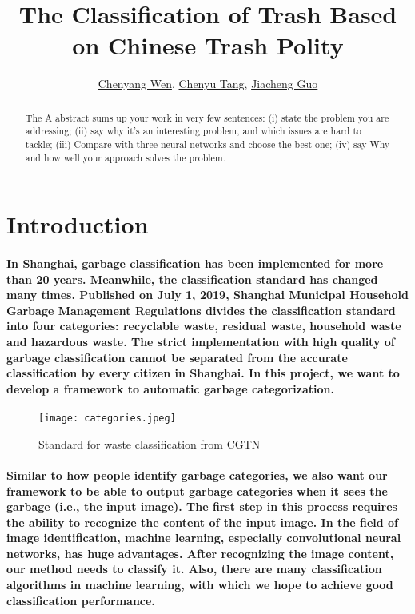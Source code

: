 \documentclass{article}
\title{The Classification of Trash Based on Chinese Trash Polity}
\author{\href{mailto:cw3923@nyu.edu}{Chenyang Wen}, \href{mailto:ct2831@nyu.edu}{Chenyu Tang},
\href{mailto:jg5315@nyu.edu}{Jiacheng Guo}}
\date{\vspace{-5ex}} %
\begin{document}
\maketitle
\thispagestyle{firstpage}


\begin{abstract}
    The
    A abstract sums up your work in very few sentences:
    (i) state the problem you are addressing;
    (ii) say why it’s an interesting problem, and which issues are hard to tackle;
    (iii) Compare with three neural networks and choose the best one;
    (iv) say Why and how well your approach solves the problem.
\end{abstract}


\section*{Introduction}
\paragraph{In Shanghai, garbage classification has been implemented for more than 20 years. Meanwhile, the classification standard has changed many times. Published on July 1, 2019, Shanghai Municipal Household Garbage Management Regulations divides the classification standard into four categories: recyclable waste, residual waste, household waste and hazardous waste.  The strict implementation with high quality of garbage classification cannot be separated from the accurate classification by every citizen in Shanghai. In this project, we want to develop a framework to automatic garbage categorization.}

\begin{figure}
    \begin{centering}
    \texttt{[image: categories.jpeg]}
    \par\end{centering}
    \caption{Standard for waste classification from CGTN}
    \label{fig:Trash_classification}
\end{figure}

\paragraph{Similar to how people identify garbage categories, we also want our framework to be able to output garbage categories when it sees the garbage (i.e., the input image).  The first step in this process requires the ability to recognize the content of the input image. In the field of image identification, machine learning, especially convolutional neural networks, has huge advantages.  After recognizing the image content, our method needs to classify it. Also, there are many classification algorithms in machine learning, with which we hope to achieve good classification performance.}
\end{document}
